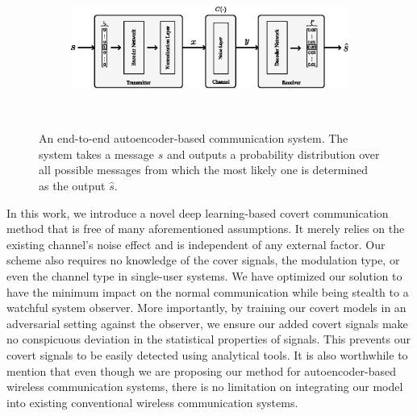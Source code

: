 \begin{figure}[tp!]
	\center
	\begin{subfigure}{0.45\textwidth}
		\includegraphics[width=\linewidth]{figs/original_autoencoder_architecture.eps}
	\end{subfigure}
	\\
	\caption{An end-to-end autoencoder-based communication system. The system takes a message \(s\) and outputs a probability distribution over all possible messages from which the most likely one is determined as the output \(\hat{s}\).}	
	\label{fig:original_autoencoder_architecture}
\end{figure}


In this work, we introduce a novel deep learning-based covert communication method that is free of many aforementioned assumptions. It merely relies on the existing channel's noise effect and is independent of any external factor. Our scheme also requires no knowledge of the cover signals, the modulation type, or even the channel type in single-user systems. We have optimized our solution to have the minimum impact on the normal communication while being stealth to a watchful system observer. More importantly, by training our covert models in an adversarial setting against the observer, we ensure our added covert signals make no conspicuous deviation in the statistical properties of signals. This prevents our covert signals to be easily detected using analytical tools. It is also worthwhile to mention that even though we are proposing our method for autoencoder-based wireless communication systems, there is no limitation on integrating our model into existing conventional wireless communication systems.


